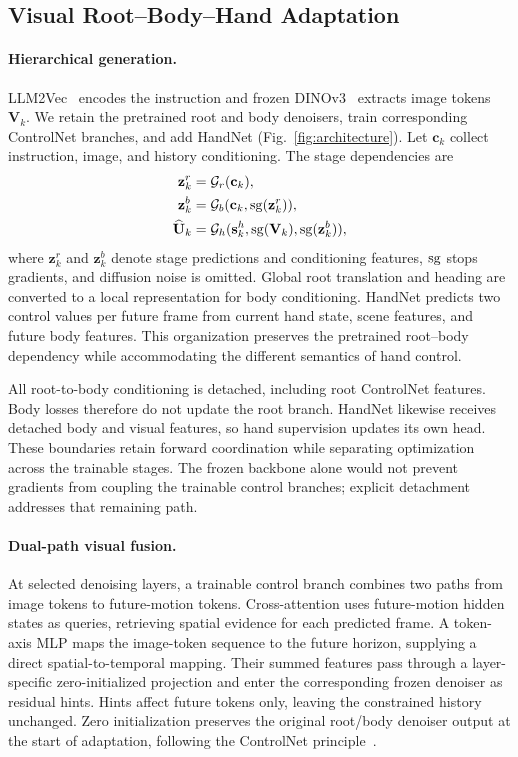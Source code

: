 \subsection{Visual Root--Body--Hand Adaptation}
\label{sec:architecture}
\paragraph{Hierarchical generation.}
LLM2Vec~\cite{behnamghader2024llm2veclargelanguagemodels} encodes the instruction and frozen DINOv3~\cite{dinov3} extracts image tokens $\mathbf{V}_k$. We retain the pretrained root and body denoisers, train corresponding ControlNet branches, and add HandNet (Fig.~\ref{fig:architecture}). Let $\mathbf{c}_k$ collect instruction, image, and history conditioning. The stage dependencies are
\begin{align}
\mathbf{z}^r_k &= \mathcal{G}_r(\mathbf{c}_k), \nonumber\\
\mathbf{z}^b_k &= \mathcal{G}_b(\mathbf{c}_k,\operatorname{sg}(\mathbf{z}^r_k)),\\
\widehat{\mathbf{U}}_k &= \mathcal{G}_h(\mathbf{s}^h_k,\operatorname{sg}(\mathbf{V}_k),\operatorname{sg}(\mathbf{z}^b_k)),\nonumber
\label{eq:stages}
\end{align}
where $\mathbf{z}^r_k$ and $\mathbf{z}^b_k$ denote stage predictions and conditioning features, $\operatorname{sg}$ stops gradients, and diffusion noise is omitted. Global root translation and heading are converted to a local representation for body conditioning. HandNet predicts two control values per future frame from current hand state, scene features, and future body features. This organization preserves the pretrained root--body dependency while accommodating the different semantics of hand control.

All root-to-body conditioning is detached, including root ControlNet features. Body losses therefore do not update the root branch. HandNet likewise receives detached body and visual features, so hand supervision updates its own head. These boundaries retain forward coordination while separating optimization across the trainable stages. The frozen backbone alone would not prevent gradients from coupling the trainable control branches; explicit detachment addresses that remaining path.

\paragraph{Dual-path visual fusion.}
At selected denoising layers, a trainable control branch combines two paths from image tokens to future-motion tokens. Cross-attention uses future-motion hidden states as queries, retrieving spatial evidence for each predicted frame. A token-axis MLP maps the image-token sequence to the future horizon, supplying a direct spatial-to-temporal mapping. Their summed features pass through a layer-specific zero-initialized projection and enter the corresponding frozen denoiser as residual hints. Hints affect future tokens only, leaving the constrained history unchanged. Zero initialization preserves the original root/body denoiser output at the start of adaptation, following the ControlNet principle~\cite{zhang2023adding}.

